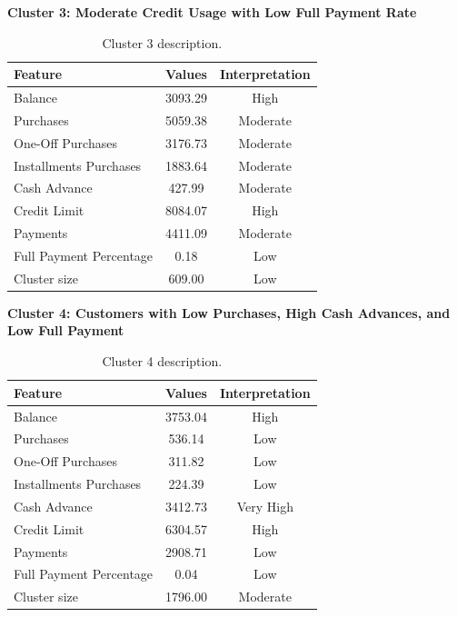 \begin{center}
\centering
\textbf{Cluster 3: Moderate Credit Usage with Low Full Payment Rate}
\begin{table}[H]
\centering
\begin{tabular}{|l|c|c|}
\hline
\textbf{Feature} & \textbf{Values} & \textbf{Interpretation} \\ \hline
Balance & 3093.29 & High \\ \hline
Purchases & 5059.38 & Moderate \\ \hline
One-Off Purchases & 3176.73 & Moderate \\ \hline
Installments Purchases & 1883.64 & Moderate \\ \hline
Cash Advance & 427.99 & Moderate \\ \hline
Credit Limit & 8084.07 & High \\ \hline
Payments & 4411.09 & Moderate \\ \hline
Full Payment Percentage & 0.18 & Low \\ \hline
Cluster size & 609.00 & Low \\ \hline
\end{tabular}
\caption{Cluster 3 description.}
\end{table}

\centering
\textbf{Cluster 4: Customers with Low Purchases, High Cash Advances, and Low Full Payment}
\begin{table}[H]
\centering
\begin{tabular}{|l|c|c|}
\hline
\textbf{Feature} & \textbf{Values} & \textbf{Interpretation} \\ \hline
Balance & 3753.04 & High \\ \hline
Purchases & 536.14 & Low \\ \hline
One-Off Purchases & 311.82 & Low \\ \hline
Installments Purchases & 224.39 & Low \\ \hline
Cash Advance & 3412.73 & Very High \\ \hline
Credit Limit & 6304.57 & High \\ \hline
Payments & 2908.71 & Low \\ \hline
Full Payment Percentage & 0.04 & Low \\ \hline
Cluster size & 1796.00 & Moderate \\ \hline
\end{tabular}
\caption{Cluster 4 description.}
\end{table}


\end{center}
